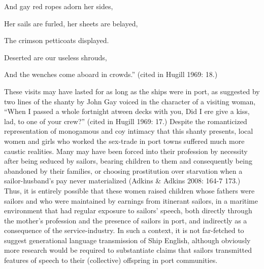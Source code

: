 \begin{styleStandard}
And gay red ropes adorn her sides, 
\end{styleStandard}

\begin{styleStandard}
Her sails are furled, her sheets are belayed, 
\end{styleStandard}

\begin{styleStandard}
The crimson petticoats displayed. 
\end{styleStandard}

\begin{styleStandard}
Deserted are our useless shrouds, 
\end{styleStandard}

\begin{styleStandard}
And the wenches come aboard in crowds.” (cited in Hugill 1969: 18.)
\end{styleStandard}

\begin{styleStandard}
These visits may have lasted for as long as the ships were in port, as suggested by two lines of the shanty by John Gay voiced in the character of a visiting woman, “When I passed a whole fortnight atween decks with you, Did I ere give a kiss, lad, to one of your crew?” (cited in Hugill 1969: 17.) Despite the romanticized representation of monogamous and coy intimacy that this shanty presents, local women and girls who worked the sex-trade in port towns suffered much more caustic realities. Many may have been forced into their profession by necessity after being seduced by sailors, bearing children to them and consequently being abandoned by their families, or choosing prostitution over starvation when a sailor-husband’s pay never materialized (Adkins \& Adkins 2008: 164-7 173.) Thus, it is entirely possible that these women raised children whose fathers were sailors and who were maintained by earnings from itinerant sailors, in a maritime environment that had regular exposure to sailors’ speech, both directly through the mother’s profession and the presence of sailors in port, and indirectly as a consequence of the service-industry. In such a context, it is not far-fetched to suggest generational language transmission of Ship English, although obviously more research would be required to substantiate claims that sailors transmitted features of speech to their (collective) offspring in port communities. 
\end{styleStandard}

